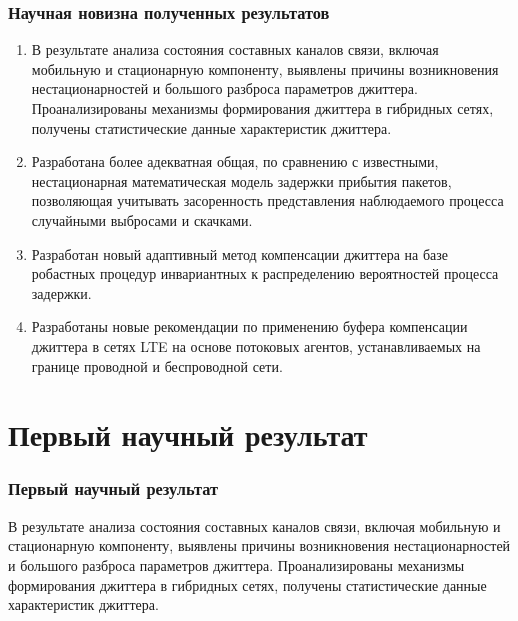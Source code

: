 \documentclass[10pt,pdf,hyperref={unicode}]{beamer}
\begin{document}
\begin{frame}
\frametitle{Научная новизна полученных результатов}
{\small
\begin{enumerate}
  \item В результате анализа состояния составных каналов связи, включая мобильную и стационарную компоненту, выявлены причины возникновения нестационарностей и большого разброса параметров джиттера.
  Проанализированы механизмы формирования джиттера в гибридных сетях, получены статистические данные характеристик джиттера.
  \item Разработана более адекватная общая, по сравнению с известными, нестационарная математическая модель задержки прибытия пакетов,
  позволяющая учитывать засоренность представления наблюдаемого процесса случайными выбросами и скачками.
  \item 
  Разработан новый адаптивный метод компенсации джиттера на базе робастных процедур инвариантных к распределению вероятностей процесса задержки.
  \item 
  Разработаны новые рекомендации по применению буфера компенсации джиттера в сетях LTE на основе потоковых агентов, устанавливаемых на границе проводной и беспроводной сети.
\end{enumerate}
}
\end{frame}





\section{Первый научный результат}

\begin{frame}
\frametitle{Первый научный результат}

{\Large В результате анализа состояния составных каналов связи, включая мобильную и стационарную компоненту, выявлены причины возникновения нестационарностей и большого разброса параметров джиттера.
  Проанализированы механизмы формирования джиттера в гибридных сетях, получены статистические данные характеристик джиттера.}

\end{frame}
\end{document}
